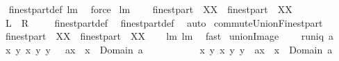 \begin{isabellebody}
%
\isadelimproof
\ \ %
\endisadelimproof
%
\isatagproof
{}\isamarkupfalse%
\ finestpart{\isacharunderscore}def\ lm{}{}{}\ \isamarkupfalse%
\ force%
\endisatagproof
{\isafoldproof}%
%
\isadelimproof
\isanewline
%
\endisadelimproof
\isanewline
{}\isamarkupfalse%
\ lm{}{}{}{\isacharcolon}\ \isanewline
\ \ {\isachardoublequoteopen}{\isasymUnion}\ {\isacharparenleft}finestpart\ {\isacharbackquote}\ XX{\isacharparenright}\ {\isasymsupseteq}\ finestpart\ {\isacharparenleft}{\isasymUnion}\ XX{\isacharparenright}{\isachardoublequoteclose}\ \isanewline
\ \ {\isacharparenleft}\ {\isachardoublequoteopen}{\isacharquery}L\ {\isasymsupseteq}\ {\isacharquery}R{\isachardoublequoteclose}{\isacharparenright}\ \isanewline
%
\isadelimproof
\ \ %
\endisadelimproof
%
\isatagproof
{}\isamarkupfalse%
\ finestpart{\isacharunderscore}def\ \isamarkupfalse%
\ finestpart{\isacharunderscore}def\ \isamarkupfalse%
\ auto%
\endisatagproof
{\isafoldproof}%
%
\isadelimproof
\isanewline
%
\endisadelimproof
\isanewline
{}\isamarkupfalse%
\ commuteUnionFinestpart{\isacharcolon}\ \isanewline
\ \ {\isachardoublequoteopen}{\isasymUnion}\ {\isacharparenleft}finestpart\ {\isacharbackquote}\ XX{\isacharparenright}\ {\isacharequal}\ finestpart\ {\isacharparenleft}{\isasymUnion}\ XX{\isacharparenright}{\isachardoublequoteclose}\isanewline
%
\isadelimproof
\ \ %
\endisadelimproof
%
\isatagproof
{}\isamarkupfalse%
\ lm{}{}{}\ lm{}{}{}\ \isamarkupfalse%
\ fast%
\endisatagproof
{\isafoldproof}%
%
\isadelimproof
\isanewline
%
\endisadelimproof
\isanewline
{}\isamarkupfalse%
\ unionImage{\isacharcolon}\ \isanewline
\ \ \ {\isachardoublequoteopen}runiq\ a{\isachardoublequoteclose}\ \isanewline
\ \ \ {\isachardoublequoteopen}{\isacharbraceleft}{\isacharparenleft}x{\isacharcomma}\ {\isacharbraceleft}y{\isacharbraceright}{\isacharparenright}{\isacharbar}\ x\ y{\isachardot}\ y\ {\isasymin}\ {\isasymUnion}\ {\isacharparenleft}a{\isacharbackquote}{\isacharbackquote}{\isacharbraceleft}x{\isacharbraceright}{\isacharparenright}\ {\isacharampersand}\ x\ {\isasymin}\ Domain\ a{\isacharbraceright}\ {\isacharequal}\ \isanewline
\ \ \ \ \ \ \ \ \ {\isacharbraceleft}{\isacharparenleft}x{\isacharcomma}\ {\isacharbraceleft}y{\isacharbraceright}{\isacharparenright}{\isacharbar}\ x\ y{\isachardot}\ y\ {\isasymin}\ a{\isacharcomma}{\isacharcomma}x\ {\isacharampersand}\ x\ {\isasymin}\ Domain\ a{\isacharbraceright}{\isachardoublequoteclose}\ \isanewline

\end{isabellebody}
